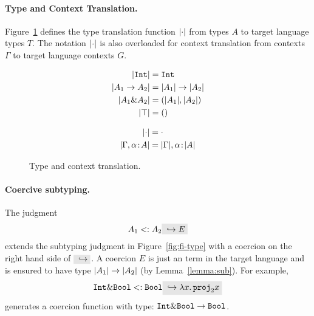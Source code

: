 \paragraph{Type and Context Translation.}

Figure~\ref{fig:type-and-context-translation} defines the type translation
function $\lvert \cdot \rvert$ from \name types $A$ to target language types $T$. The
notation $\lvert \cdot \rvert$ is also overloaded for context translation from \name
contexts $\Gamma$ to target language contexts $G$.

\begin{figure}[t]

  \begin{align*}
    \lvert \texttt{Int} \rvert     &= \texttt{Int} \\
    \lvert A_1 \to A_2 \rvert    &= \lvert A_1 \rvert \to \lvert A_2 \rvert \\
    \lvert A_1 \& A_2 \rvert &= (\lvert A_1 \rvert, \lvert A_2 \rvert) \\
    \lvert \top \rvert             &= () \\
  \end{align*}


  \begin{align*}
    \lvert \cdot \rvert                      &= \cdot \\
    \lvert \Gamma, \alpha \!:\! A \rvert &= \lvert \Gamma \rvert, \alpha \!:\! \lvert A \rvert
  \end{align*}

  \caption{Type and context translation.}
  \label{fig:type-and-context-translation}
\end{figure}


\paragraph{Coercive subtyping.}

The judgment
\[
A_1 \subtype A_2 \yields E
\]
extends the subtyping judgment in Figure~\ref{fig:fi-type} with a coercion
on the right hand side of $ \yields {} $. A coercion $ E $ is just an term
in the target language and is ensured to have type
$ \lvert A_1 \rvert \to \lvert A_2 \rvert $ (by Lemma~\ref{lemma:sub}). For example,
\[
\code{Int} \inter \code{Bool} \subtype \code{Bool} \yields {\lamty x {\im {\code{Int} \inter \code{Bool}}} {\proj 2 x}}
\]
generates a coercion function with type: $\texttt{Int} \& \texttt{Bool} \to \texttt{Bool}$.

